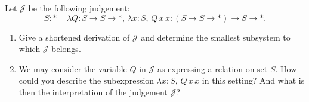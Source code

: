 \begin{problem}{6.5}
    Let $\mathcal{J}$ be the following judgement:
    $$S : \ast \vdash \lambda Q : S \rightarrow S \rightarrow \ast, \, \lambda x : S, \, Q \, x \, x : (S \rightarrow S \rightarrow \ast) \rightarrow S \rightarrow \ast.$$
    \begin{enumerate}[label=$(\alph*)$]
    \item Give a shortened derivation of $\mathcal{J}$ and determine the smallest subsystem to which $\mathcal{J}$ belongs.
    \item We may consider the variable $Q$ in $\mathcal{J}$ as expressing a relation on set $S$. How could you describe the subexpression $\lambda x : S, \, Q \, x \, x$ in this setting? And what is then the interpretation of the judgement $\mathcal{J}$?
    \end{enumerate}
\end{problem}